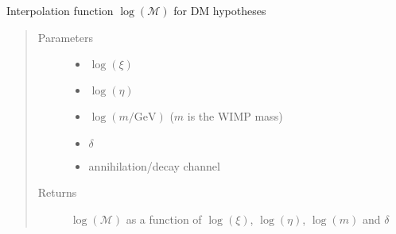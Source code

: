 \documentclass[letterpaper,10pt,english]{sphinxmanual}
\begin{document}
\begin{fulllineitems}
\label{\detokenize{diffsph.spectra:diffsph.spectra.synchrotron.lMst_DM}}
\sphinxAtStartPar
Interpolation function \(\log(\mathcal M)\) for DM hypotheses
\begin{quote}\begin{description}
\item[{Parameters}] \leavevmode\begin{itemize}
\item {} 
\sphinxAtStartPar
{} \textendash{} \(\log(\xi)\)

\item {} 
\sphinxAtStartPar
{} \textendash{} \(\log(\eta)\)

\item {} 
\sphinxAtStartPar
{} \textendash{} \(\log(m/\text{GeV})\) (\(m\) is the WIMP mass)

\item {} 
\sphinxAtStartPar
{} \textendash{} \(\delta\)

\item {} 
\sphinxAtStartPar
{} \textendash{} annihilation/decay channel

\end{itemize}

\item[{Returns}] \leavevmode
\sphinxAtStartPar
\(\log(\mathcal M)\) as a function of \(\log(\xi)\), \(\log(\eta)\), \(\log(m)\) and \(\delta\)

\end{description}\end{quote}

\end{fulllineitems}

\end{document}

